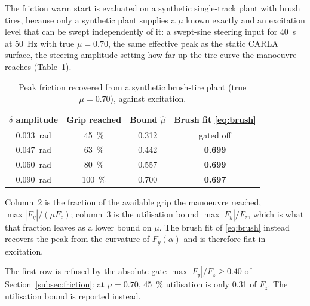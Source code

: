 The friction warm start is evaluated on a synthetic single-track plant with
brush tires, because only a synthetic plant supplies a $\mu$ known exactly and
an excitation level that can be swept independently of it: a swept-sine steering
input for \SI{40}{\second} at \SI{50}{\hertz} with true $\mu=0.70$, the same
effective peak as the static CARLA surface, the steering amplitude setting how
far up the tire curve the manoeuvre reaches (Table~\ref{tab:mu}).

\begin{table}[t]
\caption{Peak friction recovered from a synthetic brush-tire plant (true $\mu=0.70$), against excitation.}
\label{tab:mu}
\centering
\begin{threeparttable}
\small
\begin{tabular}{@{}cccc@{}}
\toprule
$\delta$ amplitude & Grip reached & Bound $\hat\mu$ & Brush fit
\eqref{eq:brush}\\
\midrule
\SI{0.033}{\radian} & \SI{45}{\percent}  & 0.312 & gated off\\
\SI{0.047}{\radian} & \SI{63}{\percent}  & 0.442 & \textbf{0.699}\\
\SI{0.060}{\radian} & \SI{80}{\percent}  & 0.557 & \textbf{0.699}\\
\SI{0.090}{\radian} & \SI{100}{\percent} & 0.700 & \textbf{0.697}\\
\bottomrule
\end{tabular}
\begin{tablenotes}[flushleft]\scriptsize
\item Column~2 is the fraction of the available grip the manoeuvre reached,
$\max|F_{y}|/(\mu F_{z})$; column~3 is the utilisation bound
$\max|F_{y}|/F_{z}$, which is what that fraction leaves as a lower bound on
$\mu$. The brush fit of \eqref{eq:brush}
instead recovers the peak from the curvature of $F_{y}(\alpha)$ and is
therefore flat in excitation.
\item The first row is refused by the absolute gate
$\max|F_{y}|/F_{z}\ge\num{0.40}$ of Section~\ref{subsec:friction}: at
$\mu=0.70$, \SI{45}{\percent} utilisation is only \num{0.31} of $F_{z}$. The
utilisation bound is reported instead.
\end{tablenotes}
\end{threeparttable}
\end{table}


